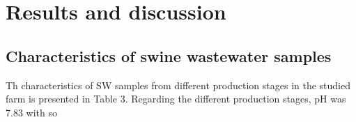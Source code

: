 \section{Results and discussion}
\subsection{Characteristics of swine wastewater samples}
Th characteristics of SW samples from different production stages in the studied farm is presented in Table 3. Regarding the different production stages, pH was 7.83 with so